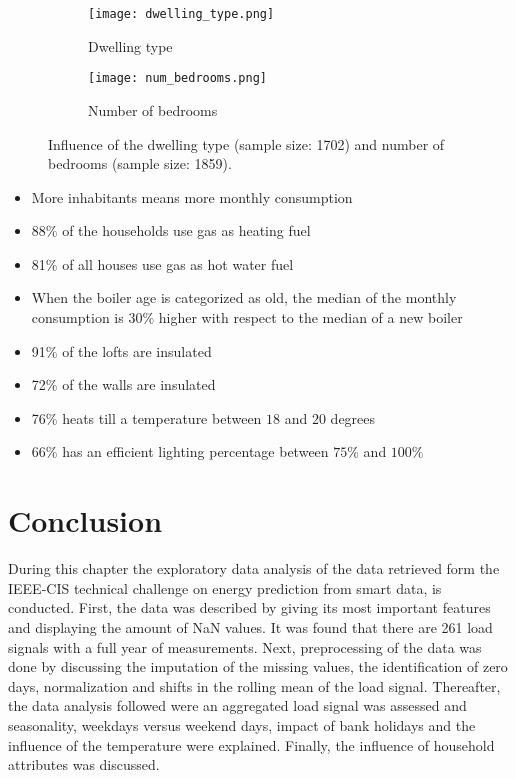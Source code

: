 \begin{figure}[h!]
	\begin{subfigure}{1.0\textwidth}
		\centering
		\texttt{[image: dwelling\_type.png]}
		\caption{Dwelling type}
	\end{subfigure}	 	
	\begin{subfigure}{1.0\textwidth}
		\centering
		\texttt{[image: num\_bedrooms.png]}
		\caption{Number of bedrooms}
	\end{subfigure}	
	\caption{Influence of the dwelling type (sample size: 1702) and number of bedrooms (sample size: 1859). }
	\label{fig:boxplots}
\end{figure}


\begin{itemize}
	\item More inhabitants means more monthly consumption
	\item 88$ \% $  of the households use gas as heating fuel
	\item 81$ \% $  of all houses use gas as hot water fuel
	\item When the boiler age is categorized as old, the median of the monthly consumption is 30$ \% $ higher with respect to the median of a new boiler
	\item 91$\% $ of the lofts are insulated
	\item 72$ \% $ of the walls are insulated
	\item 76$ \% $ heats till a temperature between $ 18 $ and $ 20  $ degrees
	\item 66$ \% $ has an efficient lighting percentage between $ 75\% $ and $ 100\% $	
\end{itemize}



\section{Conclusion}
During this chapter the exploratory data analysis of the data retrieved form the IEEE-CIS technical challenge on energy prediction from smart data, is conducted. First, the data was described by giving its most important features and displaying the amount of NaN values. It was found that there are 261 load signals with a full year of measurements.  Next, preprocessing of the data was done by discussing the imputation of the missing values, the identification of zero days, normalization and shifts in the rolling mean of the load signal. Thereafter, the data analysis followed were an aggregated load signal was assessed and seasonality, weekdays versus weekend days, impact of bank holidays and the influence of the temperature were explained. Finally, the influence of household attributes was discussed. 



